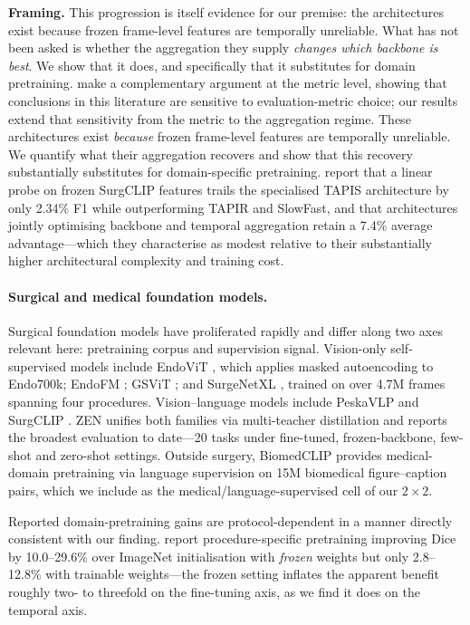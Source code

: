 \documentclass[10pt,twocolumn]{article}
\begin{document}
\textbf{Framing.} This progression is itself evidence for our premise: the
architectures exist because frozen frame-level features are temporally
unreliable. What has not been asked is whether the aggregation they supply
\emph{changes which backbone is best}. We show that it does, and specifically
that it substitutes for domain pretraining. \citet{funke2023metrics} make a
complementary argument at the metric level, showing that conclusions in this
literature are sensitive to evaluation-metric choice; our results extend that
sensitivity from the metric to the aggregation regime. These
architectures exist \emph{because} frozen frame-level features are temporally
unreliable. We quantify what their aggregation recovers and show that this
recovery substantially substitutes for domain-specific pretraining. \citet{perez2026surglavi} report that a linear probe on frozen SurgCLIP
features trails the specialised TAPIS architecture by only 2.34\% F1 while
outperforming TAPIR and SlowFast, and that architectures jointly optimising
backbone and temporal aggregation retain a 7.4\% average advantage---which
they characterise as modest relative to their substantially higher
architectural complexity and training cost.

\paragraph{Surgical and medical foundation models.}
Surgical foundation models have proliferated rapidly and differ along two axes
relevant here: pretraining corpus and supervision signal. Vision-only
self-supervised models include EndoViT \citep{batic2024endovit}, which applies
masked autoencoding \citep{he2022mae} to Endo700k; EndoFM
\citep{wang2023endofm}; GSViT \citep{schmidgall2024gsvit}; and SurgeNetXL
\citep{jaspers2025surgenetxl}, trained on over 4.7M frames spanning four
procedures. Vision--language models include PeskaVLP \citep{yuan2024peskavlp}
and SurgCLIP \citep{perez2026surglavi}. ZEN \citep{zen2026} unifies both
families via multi-teacher distillation and reports the broadest evaluation to
date---20 tasks under fine-tuned, frozen-backbone, few-shot and zero-shot
settings. Outside surgery, BiomedCLIP \citep{zhang2023biomedclip} provides
medical-domain pretraining via language supervision on 15M biomedical
figure--caption pairs, which we include as the medical/language-supervised cell
of our $2\times2$.

Reported domain-pretraining gains are protocol-dependent in a manner directly
consistent with our finding. \citet{jaspers2025surgenetxl} report
procedure-specific pretraining improving Dice by 10.0--29.6\% over ImageNet
initialisation with \emph{frozen} weights but only 2.8--12.8\% with trainable
weights---the frozen setting inflates the apparent benefit roughly two- to
threefold on the fine-tuning axis, as we find it does on the temporal axis.
\end{document}

